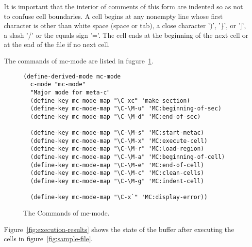 \documentclass{article}
\begin{document}
It is important that the interior of comments of this form are indented so as
not to confuse cell boundaries.
A cell begins at any nonempty line whose first character is other than white space (space or tab), a close character ')', '\}', or ']', a slash '/' or the equals sign '='.
The cell ends at the beginning of the next cell or at the end of the file if no next cell.

The commands of mc-mode are listed in fugure~\ref{fig:mc-commands}.

\begin{figure}
  
\begin{verbatim}
(define-derived-mode mc-mode
  c-mode "mc-mode"
  "Major mode for meta-c"
  (define-key mc-mode-map "\C-xc" 'make-section)
  (define-key mc-mode-map "\C-\M-u" 'MC:beginning-of-sec)
  (define-key mc-mode-map "\C-\M-d" 'MC:end-of-sec)
  
  (define-key mc-mode-map "\C-\M-s" 'MC:start-metac)
  (define-key mc-mode-map "\C-\M-x" 'MC:execute-cell)
  (define-key mc-mode-map "\C-\M-r" 'MC:load-region)
  (define-key mc-mode-map "\C-\M-a" 'MC:beginning-of-cell)
  (define-key mc-mode-map "\C-\M-e" 'MC:end-of-cell)
  (define-key mc-mode-map "\C-\M-c" 'MC:clean-cells)
  (define-key mc-mode-map "\C-\M-g" 'MC:indent-cell)

  (define-key mc-mode-map "\C-x`" 'MC:display-error))
\end{verbatim}

\caption{The Commands of mc-mode.}
\label{fig:mc-commands}
\end{figure}

Figure~\ref{fig:execution-results} shows the state of the buffer after executing the cells in figure~\ref{fig:sample-file}.
\end{document}
